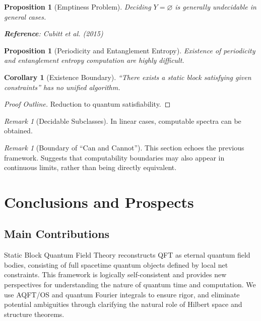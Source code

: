 \documentclass[11pt]{article}
\newtheorem{proposition}[theorem]{Proposition}
\newtheorem{corollary}[theorem]{Corollary}
\theoremstyle{definition}
\theoremstyle{remark}
\newtheorem{remark}[theorem]{Remark}
\begin{document}
\begin{proposition}[Emptiness Problem]\label{prop:emptiness}
Deciding \( Y = \varnothing \) is generally undecidable in general cases.

\textbf{Reference}: Cubitt et al. (2015)
\end{proposition}

\begin{proposition}[Periodicity and Entanglement Entropy]\label{prop:period}
Existence of periodicity and entanglement entropy computation are highly difficult.
\end{proposition}

\begin{corollary}[Existence Boundary]\label{cor:boundary}
``There exists a static block satisfying given constraints'' has no unified algorithm.
\end{corollary}

\begin{proof}[Proof Outline]
Reduction to quantum satisfiability.
\end{proof}

\begin{remark}[Decidable Subclasses]
In linear cases, computable spectra can be obtained.
\end{remark}

\begin{remark}[Boundary of ``Can and Cannot'']
This section echoes the previous framework. Suggests that computability boundaries may also appear in continuous limits, rather than being directly equivalent.
\end{remark}

\section{Conclusions and Prospects}\label{sec:conclusions}

\subsection{Main Contributions}

Static Block Quantum Field Theory reconstructs QFT as eternal quantum field bodies, consisting of full spacetime quantum objects defined by local net constraints. This framework is logically self-consistent and provides new perspectives for understanding the nature of quantum time and computation. We use AQFT/OS and quantum Fourier integrals to ensure rigor, and eliminate potential ambiguities through clarifying the natural role of Hilbert space and structure theorems.
\end{document}
